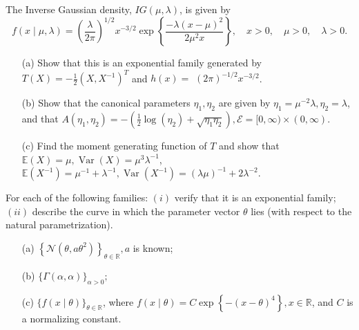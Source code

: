 \documentclass[12pt]{article}
\begin{document}
    \begin{exercise}
        The Inverse Gaussian density, \(I G(\mu, \lambda)\), is given by
        \[
            f(x \mid \mu, \lambda)=\left(\frac{\lambda}{2 \pi}\right)^{1 / 2} x^{-3 / 2} \exp \left\{\frac{-\lambda(x-\mu)^{2}}{2 \mu^{2} x}\right\}, \quad x>0, \quad \mu>0, \quad \lambda>0. 
        \]
        \begin{itemize}
            \item[(a)] Show that this is an exponential family generated by \(T(X)=-\frac{1}{2}\left(X, X^{-1}\right)^{T}\) and \(h(x)=\) \((2 \pi)^{-1 / 2} x^{-3 / 2}\). 
            \item[(b)] Show that the canonical parameters \(\eta_{1}, \eta_{2}\) are given by \(\eta_{1}=\mu^{-2} \lambda, \eta_{2}=\lambda\), and that \(A\left(\eta_{1}, \eta_{2}\right)=-\left(\frac{1}{2} \log \left(\eta_{2}\right)+\sqrt{\eta_{1} \eta_{2}}\right), \mathcal{E}=[0, \infty) \times(0, \infty)\). 
            \item[(c)] Find the moment generating function of \(T\) and show that \(\mathbb{E}(X)=\mu, \operatorname{Var}(X)=\mu^{3} \lambda^{-1}\), \(\mathbb{E}\left(X^{-1}\right)=\mu^{-1}+\lambda^{-1}, \operatorname{Var}\left(X^{-1}\right)=(\lambda \mu)^{-1}+2 \lambda^{-2} .\)
        \end{itemize}
    \end{exercise}

    \begin{exercise}
        For each of the following families: \((i)\) verify that it is an exponential family; \((i i)\) describe the curve in which the parameter vector \(\theta\) lies (with respect to the natural parametrization). 
        \begin{itemize}
            \item[(a)] \(\left\{\mathcal{N}\left(\theta, a \theta^{2}\right)\right\}_{\theta \in \mathbb{R}}, a\) is known;
            \item[(b)] \(\{\Gamma(\alpha, \alpha)\}_{\alpha>0} ;\)
            \item[(c)] \(\{f(x \mid \theta)\}_{\theta \in \mathbb{R}}\), where \(f(x \mid \theta)=C \exp \left\{-(x-\theta)^{4}\right\}, x \in \mathbb{R}\), and \(C\) is a normalizing constant.
        \end{itemize}
    \end{exercise}
\end{document}
